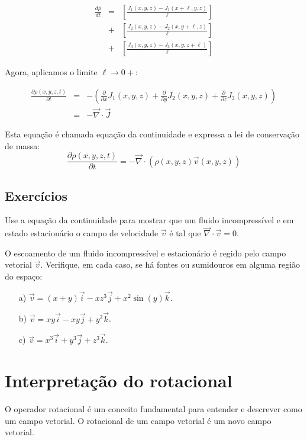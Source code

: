 \begin{eqnarray*}
  \frac{d \bar{\rho}}{d t} &=& \left[\frac{J_1(x, y, z)-J_1(x+\ell, y, z)}{\ell}\right] \\
  &+&  \left[\frac{J_2(x, y, z)-J_2(x, y+\ell, z)}{\ell}\right]\\
  &+&  \left[\frac{J_3(x, y, z)-J_3(x, y, z+\ell)}{\ell}\right]
\end{eqnarray*}

Agora, aplicamos o limite $\ell \to 0+$:

\begin{eqnarray*}
  \frac{\partial \rho(x,y,z,t)}{\partial t} &=& -\left(\frac{\partial}{\partial x}J_1(x, y, z)+\frac{\partial}{\partial y}J_2(x, y, z)+\frac{\partial}{\partial z}J_3(x, y, z)\right)\\
  &=&-\vec{\nabla}\cdot\vec{J}
\end{eqnarray*}

Esta equação é chamada equação da continuidade e expressa a lei de conservação de massa:
$$\frac{\partial \rho(x,y,z,t)}{\partial t}=-\vec{\nabla}\cdot\left(\rho(x,y,z) \vec{v}(x,y,z)\right) $$

\subsection*{Exercícios}
\begin{exer}
Use a equação da continuidade para mostrar que um fluido incompressível e em estado estacionário o campo de velocidade $\vec{v}$ é tal que $\vec{\nabla}\cdot \vec{v}=0$.
\end{exer}
\begin{exer}
 O escoamento de um fluido incompressível e estacionário é regido pelo campo vetorial $\vec{v}$. Verifique, em cada caso, se há fontes ou sumidouros em alguma região do espaço:
 \begin{itemize}
  \item[a)] $\vec{v}=(x+y)\vec{i}-xz^3\vec{j}+x^2\sin(y)\vec{k}$.
  \item[b)] $\vec{v}=xy\vec{i}-xy\vec{j}+y^2\vec{k}$.
  \item[c)] $\vec{v}=x^3\vec{i}+y^3\vec{j}+z^3\vec{k}$.

  \end{itemize}

\end{exer}



\section{Interpretação do rotacional}
O operador rotacional é um conceito fundamental para entender e descrever como um campo vetorial. O rotacional de um campo vetorial é um novo campo vetorial.

